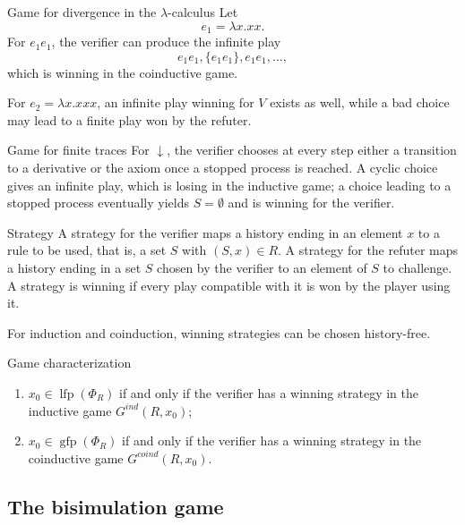 \documentclass[a4paper]{article}
\newcommand{\lfp}{\operatorname{lfp}}
\newcommand{\gfp}{\operatorname{gfp}}
\begin{document}
\begin{snippetexample}{Game for divergence in the \(\lambda\)-calculus}
    Let
    \[
        e_1=\lambda x.xx.
    \]
    For \(e_1e_1\), the verifier can produce the infinite play
    \[
        e_1e_1,\{e_1e_1\},e_1e_1,\ldots,
    \]
    which is winning in the coinductive game.

    For \(e_2=\lambda x.xxx\), an infinite play winning for \(V\) exists as well, while a bad choice may lead to a finite play won by the refuter.
\end{snippetexample}

\begin{snippetexample}{Game for finite traces}
    For \(\downarrow\), the verifier chooses at every step either a transition to a derivative or the axiom once a stopped process is reached.
    A cyclic choice gives an infinite play, which is losing in the inductive game; a choice leading to a stopped process eventually yields \(S=\emptyset\) and is winning for the verifier.
\end{snippetexample}

\begin{snippetdefinition}{Strategy}
    A strategy for the verifier maps a history ending in an element \(x\) to a rule to be used, that is, a set \(S\) with \((S,x)\in R\).
    A strategy for the refuter maps a history ending in a set \(S\) chosen by the verifier to an element of \(S\) to challenge.
    A strategy is winning if every play compatible with it is won by the player using it.
\end{snippetdefinition}

For induction and coinduction, winning strategies can be chosen history-free.

\begin{snippettheorem}{Game characterization}
    \begin{enumerate}
        \item \(x_0\in\lfp(\Phi_R)\) if and only if the verifier has a winning strategy in the inductive game \(G^{ind}(R,x_0)\);
        \item \(x_0\in\gfp(\Phi_R)\) if and only if the verifier has a winning strategy in the coinductive game \(G^{coind}(R,x_0)\).
    \end{enumerate}
\end{snippettheorem}

\subsection{The bisimulation game}
\end{document}

